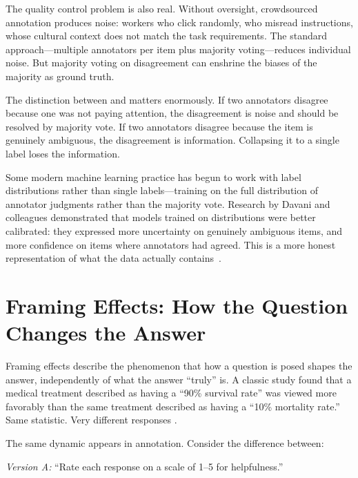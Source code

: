 The quality control problem is also real. Without oversight, crowdsourced annotation produces noise: workers who click randomly, who misread instructions, whose cultural context does not match the task requirements. The standard approach---multiple annotators per item plus majority voting---reduces individual noise. But majority voting on disagreement can enshrine the biases of the majority as ground truth.

The distinction between  and  matters enormously. If two annotators disagree because one was not paying attention, the disagreement is noise and should be resolved by majority vote. If two annotators disagree because the item is genuinely ambiguous, the disagreement is information. Collapsing it to a single label loses the information.

\begin{examplebox}
Some modern machine learning practice has begun to work with label distributions rather than single labels---training on the full distribution of annotator judgments rather than the majority vote. Research by Davani and colleagues demonstrated that models trained on distributions were better calibrated: they expressed more uncertainty on genuinely ambiguous items, and more confidence on items where annotators had agreed. This is a more honest representation of what the data actually contains~\autocite{davani2022dealing}.
\end{examplebox}

\section{Framing Effects: How the Question Changes the Answer}
\label{sec:ch7-framing}

Framing effects describe the phenomenon that how a question is posed shapes the answer, independently of what the answer ``truly'' is. A classic study found that a medical treatment described as having a ``90\% survival rate'' was viewed more favorably than the same treatment described as having a ``10\% mortality rate.'' Same statistic. Very different responses \autocite{mcneil1982elicitation}.

The same dynamic appears in annotation. Consider the difference between:

\begin{center}
\textit{Version A:} ``Rate each response on a scale of 1--5 for helpfulness.''
\end{center}

